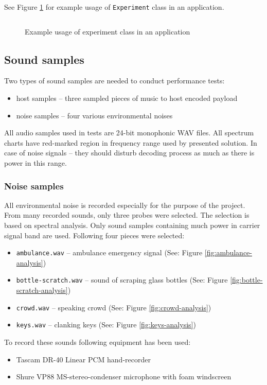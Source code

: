 \documentclass[english,bachelor,a4paper,oneside]{ppfcmthesis}
\begin{document}
See Figure \ref{fig:experiment-application} for example usage of \verb|Experiment| class in an application.
\begin{figure}[h]
  \centering
  \inputminted[linenos]{python}{listings/experiment_example.py}
  \caption{Example usage of experiment class in an application}
  \label{fig:experiment-application}
\end{figure}

\subsection{Sound samples}
\label{subsec:sound-samples}
Two types of sound samples are needed to conduct performance tests:
\begin{itemize}
  \item host samples -- three sampled pieces of music to host encoded payload
  \item noise samples -- four various environmental noises
\end{itemize}
All audio samples used in tests are 24-bit monophonic WAV files. All spectrum charts have red-marked region in frequency range
used by presented solution. In case of noise signals -- they should disturb decoding process as much as there is power in this range.

\subsubsection{Noise samples}
All environmental noise is recorded especially for the purpose of the project. From many recorded sounds, only
three probes were selected. The selection is based on spectral analysis. Only sound samples containing much power in carrier signal
band are used.
Following four pieces were selected:
\begin{itemize}
  \item \verb|ambulance.wav| -- ambulance emergency signal (See: Figure \ref{fig:ambulance-analysis})
  \item \verb|bottle-scratch.wav| -- sound of scraping glass bottles (See: Figure \ref{fig:bottle-scratch-analysis})
  \item \verb|crowd.wav| -- speaking crowd (See: Figure \ref{fig:crowd-analysis})
  \item \verb|keys.wav| -- clanking keys (See: Figure \ref{fig:keys-analysis})
\end{itemize}


\noindent To record these sounds following equipment has been used:
\begin{itemize}
  \item Tascam DR-40 Linear PCM hand-recorder
  \item Shure VP88 MS-stereo-condenser microphone with foam windscreen
\end{itemize}
\end{document}

